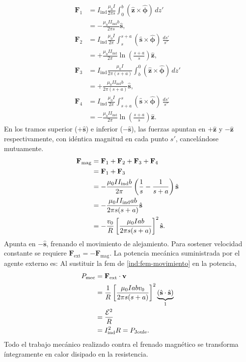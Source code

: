 \documentclass[11pt]{article}
\begin{document}
\begin{align*}
    \mathbf F_1
    &=I_{\mathrm{ind}}\frac{\mu_0 I}{2\pi s}
      \int_0^b(\hat{\mathbf z}\times\hat{\boldsymbol\phi})\,dz'\\
    &=-\frac{\mu_0 I I_{\mathrm{ind}}b}{2\pi s}\hat{\mathbf s},\\[3pt]
    \mathbf F_2
    &=I_{\mathrm{ind}}\frac{\mu_0 I}{2\pi}
      \int_s^{s+a}
      (\hat{\mathbf s}\times\hat{\boldsymbol\phi})\,\frac{ds'}{s'}\\
    &=+\frac{\mu_0 I I_{\mathrm{ind}}}{2\pi}
      \ln\!\left(\frac{s+a}{s}\right)\hat{\mathbf z},\\[3pt]
    \mathbf F_3
    &=I_{\mathrm{ind}}\frac{\mu_0 I}{2\pi(s+a)}
      \int_b^0(\hat{\mathbf z}\times\hat{\boldsymbol\phi})\,dz'\\
    &=+\frac{\mu_0 I I_{\mathrm{ind}}b}{2\pi(s+a)}\hat{\mathbf s},\\[3pt]
    \mathbf F_4
    &=I_{\mathrm{ind}}\frac{\mu_0 I}{2\pi}
      \int_{s+a}^s
      (\hat{\mathbf s}\times\hat{\boldsymbol\phi})\,\frac{ds'}{s'}\\
    &=-\frac{\mu_0 I I_{\mathrm{ind}}}{2\pi}
      \ln\!\left(\frac{s+a}{s}\right)\hat{\mathbf z}.
\end{align*}
En los tramos superior ($+\hat{\mathbf{s}}$) e inferior ($-\hat{\mathbf{s}}$), las fuerzas apuntan en $+\hat{\mathbf{z}}$ y $-\hat{\mathbf{z}}$ respectivamente, con idéntica magnitud en cada punto $s'$, cancelándose mutuamente.
\begin{align}
    \mathbf F_{\mathrm{mag}}
    &=\mathbf F_1+\mathbf F_2+\mathbf F_3+\mathbf F_4
      \notag\\
    &=\mathbf F_1+\mathbf F_3
      \notag\\
    &=-\frac{\mu_0 I I_{\mathrm{ind}} b}{2\pi}
      \left(\frac{1}{s}-\frac{1}{s+a}\right)\hat{\mathbf s}
      \notag\\
    &=-\frac{\mu_0 I I_{\mathrm{ind}}ab}{2\pi s(s+a)}
      \hat{\mathbf s}
      \notag\\
    &=-\frac{v_0}{R}
      \left[\frac{\mu_0 Iab}{2\pi s(s+a)}\right]^2\hat{\mathbf s}.
\end{align}
Apunta en $-\hat{\mathbf{s}}$, frenando el movimiento de alejamiento. Para sostener velocidad constante se requiere $\mathbf{F}_{\text{ext}} = -\mathbf{F}_{\text{mag}}$. La potencia mecánica suministrada por el agente externo es:
Al sustituir la fem de \eqref{ind:fem-movimiento} en la potencia,
\begin{align}
    P_{\text{mec}}
    &=\mathbf F_{\text{ext}}\cdot\mathbf v
      \notag\\
    &=\frac{1}{R}
      \left[\frac{\mu_0 Iabv_0}{2\pi s(s+a)}\right]^2
      \underbrace{(\hat{\mathbf s}\cdot\hat{\mathbf s})}_{1}
      \notag\\
    &=\frac{\mathcal E^2}{R}
      \notag\\
    &=I_{\mathrm{ind}}^2R=P_{\text{Joule}}.
\end{align}
Todo el trabajo mecánico realizado contra el frenado magnético se transforma íntegramente en calor disipado en la resistencia.
\end{document}

